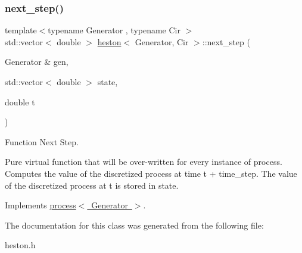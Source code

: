 \subsubsection{\texorpdfstring{next\+\_\+step()}{next\_step()}}
{\footnotesize\ttfamily template$<$typename Generator , typename Cir $>$ \\
std\+::vector$<$ double $>$ \mbox{\hyperlink{classheston}{heston}}$<$ Generator, Cir $>$\+::next\+\_\+step (\begin{DoxyParamCaption}\item[{Generator \&}]{gen,  }\item[{std\+::vector$<$ double $>$}]{state,  }\item[{double}]{t }\end{DoxyParamCaption})\hspace{0.3cm}{\ttfamily [virtual]}}



Function Next Step. 

Pure virtual function that will be over-\/written for every instance of process. Computes the value of the discretized process at time t + time\+\_\+step. The value of the discretized process at t is stored in state. 

Implements \mbox{\hyperlink{classprocess_a55c46e4b4ab1992ce09f4133fb484fd6}{process$<$ Generator $>$}}.



The documentation for this class was generated from the following file\+:\begin{DoxyCompactItemize}
\item 
heston.\+h\end{DoxyCompactItemize}
